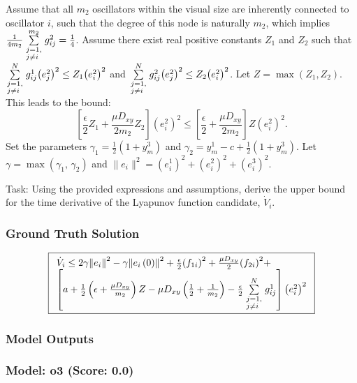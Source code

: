 \documentclass[10pt]{article}
\begin{document}
Assume that all $m_2$ oscillators within the visual size are inherently connected to oscillator $i$, such that the degree of this node is naturally $m_2$, which implies $\frac{1}{{4{m_2}}}\sum\limits_{\scriptstyle j = 1,\hfill\atop \scriptstyle j \ne i\hfill}^{{m_2}} {g _{ij}^2} = \frac{1}{4}$.
Assume there exist real positive constants $Z_1$ and $Z_2$ such that $\sum\limits_{\scriptstyle j = 1,\hfill\atop \scriptstyle j \ne i\hfill}^N {g_{ij}^1{{\left( {e_j^2} \right)}^2}} \le {Z_1}{\left( {e_i^2} \right)^2}$ and $\sum\limits_{\scriptstyle j = 1,\hfill\atop \scriptstyle j \ne i\hfill}^N {g _{ij}^2{{\left( {e_j^2} \right)}^2}} \le {Z_2}{\left( {e_i^2} \right)^2}$. Let $Z = \max\left( {Z_1, Z_2} \right)$. This leads to the bound:
$$
\left[ {\frac{\epsilon }{2}{Z_1} + \frac{{\mu {D_{xy}}}}{{2{m_2}}}{Z_2}} \right]{\left( {e_i^2} \right)^2} \le \left[ {\frac{\epsilon }{2} + \frac{{\mu {D_{xy}}}}{{2{m_2}}}} \right]Z{\left( {e_i^2} \right)^2}.
$$
Set the parameters ${\gamma _1} = \frac{1}{2}\left( {1 + y_m^3} \right)$ and ${\gamma _2} = y_m^1 - c + \frac{1}{2}\left( {1 + y_m^3} \right)$. Let $\gamma  = \max\left( {{\gamma _1},\,{\gamma _2}} \right)$ and $\|e_i\|^2 = (e_i^1)^2 + (e_i^2)^2 + (e_i^3)^2$.

Task:
Using the provided expressions and assumptions, derive the upper bound for the time derivative of the Lyapunov function candidate, $\dot{V}_i$.

\subsubsection*{Ground Truth Solution}
\[ \boxed{\begin{array}{l}
{{\dot V}_i} \le 2\gamma {\left\| {{e_i}} \right\|^2} - \gamma {\left\| {{e_i}\left( 0 \right)} \right\|^2} + \frac{\epsilon }{2}{\left( {{f_{1i}}} \right)^2} + \frac{{\mu {D_{xy}}}}{2}{\left( {{f_{2i}}} \right)^2} +\\
 \left[ {a + \frac{1}{2}\left( {\epsilon  + \frac{{\mu {D_{xy}}}}{{{m_2}}}} \right)Z - \mu {D_{xy}}\left( {\frac{1}{2} + \frac{1}{{{m_2}}}} \right) - \frac{\epsilon }{2}\sum\limits_{\scriptstyle j = 1,\hfill\atop \scriptstyle j \ne i\hfill}^N {g_{ij}^1} } \right]{\left( {e_i^2} \right)^2}
\end{array}} \]

\subsubsection*{Model Outputs}
\subsubsection*{Model: o3 (Score: 0.0)}
\end{document}
